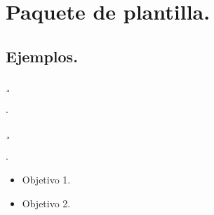 \chapter{Paquete de plantilla.}

\section{Ejemplos.}






¸

.

¸

.

\begin{nkObjective}
	\begin{itemize}
		\item Objetivo 1.
		\item Objetivo 2.
	\end{itemize}
\end{nkObjective}


